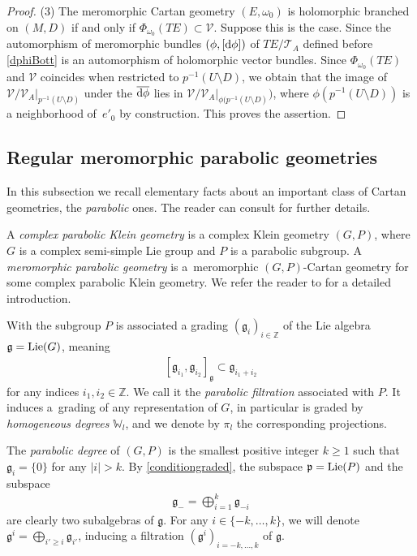 \documentclass[10pt,a4paper]{amsart}
\numberwithin{equation}{section}
\begin{document}
\begin{proof}
(3) The meromorphic Cartan geometry $(E,\omega_0)$ is holomorphic branched on $(M,D)$ if and only if $\Phi_{\omega_0}(TE)\subset \mathcal{V}$. Suppose this is the case. Since the automorphism of meromorphic bundles $(\phi,[{\rm d}\phi])$ of $TE/\mathcal{T}_A$ defined before \eqref{dphiBott} is an automorphism of holomorphic vector bundles. Since $\Phi_{\omega_0}(TE)$ and $\mathcal{V}$ coincides when restricted to $p^{-1}(U\setminus D)$, we obtain that the image of $\mathcal{V}/\mathcal{V}_A\vert_{p^{-1}(U\setminus D)}$ under the $\overline{{\rm d}\phi}$ lies in $\mathcal{V}/\mathcal{V}_A\vert_{\phi(p^{-1}(U\setminus D)})$, where $\phi(p^{-1}(U\setminus D))$ is a neighborhood of~$e'_0$ by construction. This proves the assertion.
\end{proof}


\subsection{ Regular meromorphic parabolic geometries}\label{sectionparabolique}
In this subsection we recall elementary facts about an important class of Cartan geometries, the \textit{parabolic} ones. The reader can consult \cite{Cap} for further details.

 A \textit{complex parabolic Klein geometry} is a complex Klein geometry $(G,P)$, where $G$ is a complex semi-simple Lie group and $P$ is a parabolic subgroup. A \textit{meromorphic parabolic geometry} is a~meromorphic $(G,P)$-Cartan geometry for some complex parabolic Klein geometry. We refer the reader to \cite{Cap} for a detailed introduction.

 With the subgroup $P$ is associated a grading $(\mathfrak{g}_i)_{i\in \mathbb{Z}}$ of the Lie algebra $\mathfrak{g}={\rm Lie}(G)$, meaning%
  \begin{gather}\label{conditiongraded}[\mathfrak{g}_{i_1},\mathfrak{g}_{i_2}]_\mathfrak{g} \subset \mathfrak{g}_{i_1+i_2}\end{gather}
 for any indices $i_1,i_2\in \mathbb{Z}$. We call it the \textit{parabolic filtration} associated with $P$. It induces a~grading of any representation of $G$, in particular  is graded by \textit{homogeneous degrees} $\mathbb{W}_l$, and we denote by $\pi_l$ the corresponding projections.

 The \textit{parabolic degree} of $(G,P)$ is the smallest positive integer $k\geq 1$ such that $\mathfrak{g}_i =\{0\}$ for any $\vert i\vert>k$. By \eqref{conditiongraded}, the subspace $\mathfrak{p}={\rm Lie}(P)$ and the subspace
 \begin{gather*}%
 \mathfrak{g}_- = \bigoplus_{i=1}^{k}  \mathfrak{g}_{-i} \end{gather*}
 are clearly two subalgebras of $\mathfrak{g}$. For any $i\in \{-k,\dots,k\}$, we will denote $\mathfrak{g}^i = \bigoplus_{i'\geq i} \mathfrak{g}_{i'}$, inducing a filtration $(\mathfrak{g}^i)_{i=-k,\dots,k}$ of $\mathfrak{g}$.
\end{document}
